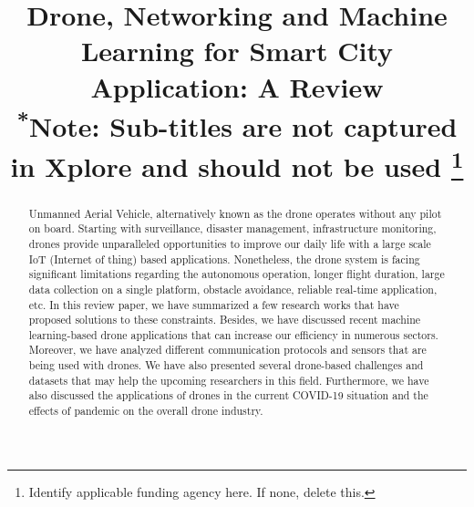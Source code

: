 \documentclass[conference]{IEEEtran}
\begin{document}

\title{Drone, Networking and  Machine Learning for Smart City Application: A Review\\
{\footnotesize \textsuperscript{*}Note: Sub-titles are not captured in Xplore and
should not be used}
\thanks{Identify applicable funding agency here. If none, delete this.}
}

\author{
\and
{}
\and
{}
}

\maketitle

\begin{abstract}
Unmanned Aerial Vehicle, alternatively known as the drone operates without any pilot on board. Starting with surveillance, disaster management, infrastructure monitoring, drones provide unparalleled opportunities to improve our daily life with a large scale IoT (Internet of thing) based applications. Nonetheless, the drone system is facing significant limitations regarding the autonomous operation, longer flight duration, large data collection on a single platform, obstacle avoidance, reliable real-time application, etc. In this review paper, we have summarized a few research works that have proposed solutions to these constraints. Besides, we have discussed recent machine learning-based drone applications that can increase our efficiency in numerous sectors. Moreover, we have analyzed different communication protocols and sensors that are being used with drones. We have also presented several drone-based challenges and datasets that may help the upcoming researchers in this field. Furthermore, we have also discussed the applications of drones in the current COVID-19 situation and the effects of pandemic on the overall drone industry.

\end{abstract}
\end{document}
